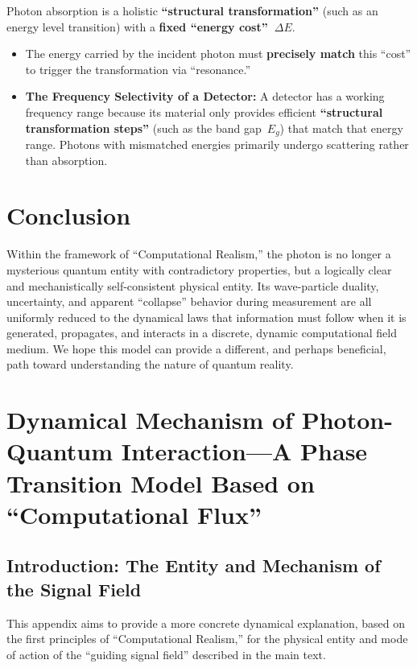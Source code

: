 \documentclass[11pt, a4paper]{article}
\begin{document}
Photon absorption is a holistic \textbf{``structural transformation''} (such as an energy level transition) with a \textbf{fixed ``energy cost''~$\Delta E$}.

\begin{itemize}
    \item The energy carried by the incident photon must \textbf{precisely match} this ``cost'' to trigger the transformation via ``resonance.''
    \item \textbf{The Frequency Selectivity of a Detector:} A detector has a working frequency range because its material only provides efficient \textbf{``structural transformation steps''} (such as the band gap~$E_g$) that match that energy range. Photons with mismatched energies primarily undergo scattering rather than absorption.
\end{itemize}

\section*{Conclusion}

Within the framework of ``Computational Realism,'' the photon is no longer a mysterious quantum entity with contradictory properties, but a logically clear and mechanistically self-consistent physical entity. Its wave-particle duality, uncertainty, and apparent ``collapse'' behavior during measurement are all uniformly reduced to the dynamical laws that information must follow when it is generated, propagates, and interacts in a discrete, dynamic computational field medium. We hope this model can provide a different, and perhaps beneficial, path toward understanding the nature of quantum reality.


\appendix
\section{Dynamical Mechanism of Photon-Quantum Interaction---A Phase Transition Model Based on ``Computational Flux''}

\subsection{Introduction: The Entity and Mechanism of the Signal Field}

This appendix aims to provide a more concrete dynamical explanation, based on the first principles of ``Computational Realism,'' for the physical entity and mode of action of the ``guiding signal field'' described in the main text.
\end{document}
